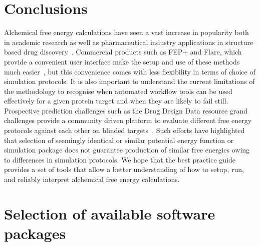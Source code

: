 \documentclass[9pt,bestpractices]{livecoms}
\begin{document}
\section{Conclusions}
\label{sec:conclusion}
Alchemical free energy calculations have seen a vast increase in popularity both in academic research as well as pharmaceutical industry applications in structure based drug discovery~\cite{schindler2020largescale, sherborne2016collaborating, wagner2017computational}. Commercial products such as FEP+ and Flare, which provide a convenient user interface make the setup and use of these methods much easier~\cite{wang2015accurate, kuhn2020assessment}, but this convenience comes with less flexibility in terms of choice of simulation protocols. It is also important to understand the current limitations of the methodology to recognise when automated workflow tools can be used effectively for a given protein target and when they are likely to fail still. Prospective prediction challenges such as the Drug Design Data resource grand challenges provide a community driven platform to evaluate different free energy protocols against each other on blinded targets~\cite{gaieb2018d3r, gaieb2019d3r}. Such efforts have highlighted that selection of seemingly identical or similar potential energy function or simulation package does not guarantee production of similar free energies owing to differences in simulation protocols. 
We hope that the best practice guide provides a set of tools that allow a better understanding of how to setup, run, and reliably interpret alchemical free energy calculations. 

\section{Selection of available software packages}
\end{document}
